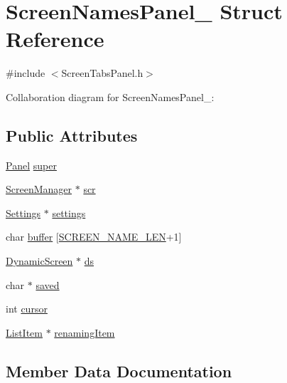 \hypertarget{structScreenNamesPanel__}{}\section{Screen\+Names\+Panel\+\_\+ Struct Reference}
\label{structScreenNamesPanel__}


{\ttfamily \#include $<$Screen\+Tabs\+Panel.\+h$>$}



Collaboration diagram for Screen\+Names\+Panel\+\_\+\+:
\subsection*{Public Attributes}
\begin{DoxyCompactItemize}
\item 
\hyperlink{Panel_8h_a034d4c16521db412dc7a1e8536d16fae}{Panel} \hyperlink{structScreenNamesPanel___adbb5fbf02b3abdbbc3760a0d86b0c466}{super}
\item 
\hyperlink{ScreenManager_8h_a798c9c69dc8024a4c6829982bf94dddd}{Screen\+Manager} $\ast$ \hyperlink{structScreenNamesPanel___a0e95a6e2b9cccc62948c1c1fe3df3d0a}{scr}
\item 
\hyperlink{Settings_8h_ad97e5960b63f21c02bf5e0e43c0ef002}{Settings} $\ast$ \hyperlink{structScreenNamesPanel___a4d61e740a5d780cd77efeb4e560e38c7}{settings}
\item 
char \hyperlink{structScreenNamesPanel___a6a0818961b7845068a60a26e7eadc524}{buffer} \mbox{[}\hyperlink{ScreensPanel_8h_a6a469d800d9e4ad22e6529c6e1148ffd}{S\+C\+R\+E\+E\+N\+\_\+\+N\+A\+M\+E\+\_\+\+L\+EN}+1\mbox{]}
\item 
\hyperlink{DynamicScreen_8h_a9b10b5a0b32fbb6fe6af7f0571ae6b25}{Dynamic\+Screen} $\ast$ \hyperlink{structScreenNamesPanel___a8c00513e786b17f79b17cbfc0256c13d}{ds}
\item 
char $\ast$ \hyperlink{structScreenNamesPanel___af6ef6ba24c8e440ec8330c221a4c8088}{saved}
\item 
int \hyperlink{structScreenNamesPanel___a48952cf6b1b62147c54ab4f6dbebb4fb}{cursor}
\item 
\hyperlink{ListItem_8h_a311dfe5c572117175446997a9e6f15b8}{List\+Item} $\ast$ \hyperlink{structScreenNamesPanel___a29134582b074cf1523d38cc6aac6d0f3}{renaming\+Item}
\end{DoxyCompactItemize}


\subsection{Member Data Documentation}
\mbox{\label{structScreenNamesPanel___a6a0818961b7845068a60a26e7eadc524}} 
